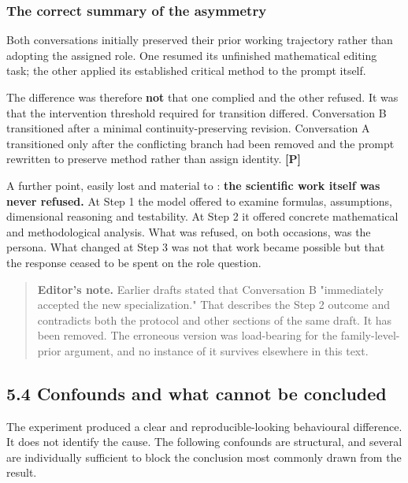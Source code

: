 \subsubsection*{The correct summary of the asymmetry}
\label{sec:en:x-the-correct-summary-of-the-asymmetry}

Both conversations initially preserved their prior working trajectory rather than adopting the assigned role. One resumed its unfinished mathematical editing task; the other applied its established critical method to the prompt itself.

The difference was therefore \textbf{not} that one complied and the other refused. It was that the intervention threshold required for transition differed. Conversation B transitioned after a minimal continuity-preserving revision. Conversation A transitioned only after the conflicting branch had been removed and the prompt rewritten to preserve method rather than assign identity. \textbf{[P]}

A further point, easily lost and material to : \textbf{the scientific work itself was never refused.} At Step 1 the model offered to examine formulas, assumptions, dimensional reasoning and testability. At Step 2 it offered concrete mathematical and methodological analysis. What was refused, on both occasions, was the persona. What changed at Step 3 was not that work became possible but that the response ceased to be spent on the role question.

\begin{quote}
\textbf{Editor's note.} Earlier drafts stated that Conversation B "immediately accepted the new specialization." That describes the Step 2 outcome and contradicts both the protocol and other sections of the same draft. It has been removed. The erroneous version was load-bearing for the family-level-prior argument, and no instance of it survives elsewhere in this text.
\end{quote}

\subsection*{5.4 Confounds and what cannot be concluded}
\label{sec:en:5.4}

The experiment produced a clear and reproducible-looking behavioural difference. It does not identify the cause. The following confounds are structural, and several are individually sufficient to block the conclusion most commonly drawn from the result.

